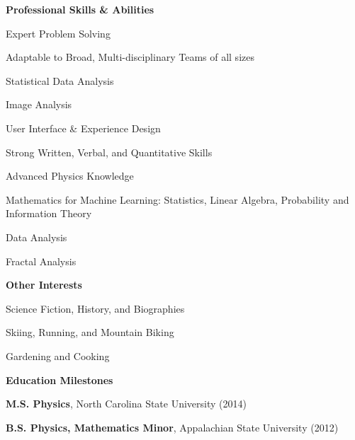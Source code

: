 \documentclass[letterpaper,final]{memoir}
\newcommand{\LargeSep}{\vspace{1.3em}}
\newcommand{\Sep}{\vspace{1.0em}}
\newcommand{\SmallSep}{\vspace{0.4em}}
\newcommand{\CVSection}[1]
	{\LARGE\textbf{#1}\par
	\SmallSep\normalsize}
\newcommand{\CVItem}[1]
	{\textbf{\color{Blue} #1}}
\begin{document}
\CVItem{Professional Skills \& Abilities}
\Sep
\begin{multicols}{2}
    \begin{compactitem}[\color{Blue}$\circ$]
        \item Expert Problem Solving
        \SmallSep
        \item Adaptable to Broad, Multi-disciplinary Teams of all sizes
        \SmallSep
        \item Statistical Data Analysis
        \SmallSep
        \item Image Analysis
        \SmallSep
        \item User Interface \& Experience Design
        \SmallSep
        \item Strong Written, Verbal, and Quantitative Skills
        \SmallSep
        \item Advanced Physics Knowledge
        \SmallSep
        \item Mathematics for Machine Learning: Statistics, Linear Algebra, Probability and Information Theory
        \SmallSep
        \item Data Analysis
        \SmallSep
        \item Fractal Analysis

	\end{compactitem}

\end{multicols}



\CVItem{Other Interests}
\Sep

\begin{multicols}{2}

    \begin{compactitem}[\color{Blue}$\circ$]

        \item Science Fiction, History, and Biographies
        \SmallSep
        \item Skiing, Running, and Mountain Biking
        \SmallSep
        \item Gardening and Cooking


	\end{compactitem}
\end{multicols}
\LargeSep

\newpage



\notoserif \CVSection{Education Milestones}
\normalfont
\Sep
\begin{compactitem}[\color{Blue}$\circ$]

\item \textbf{M.S. Physics}, North Carolina State University (2014)
\SmallSep

\item \textbf{B.S. Physics, Mathematics Minor}, Appalachian State University (2012)

\end{compactitem}
\Sep
\end{document}
